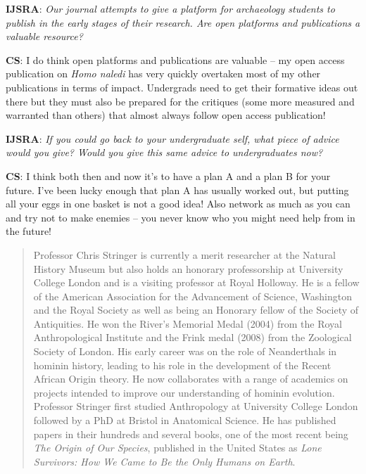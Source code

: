 \documentclass{ijsra}
\begin{document}
\textbf{IJSRA}: \textit{Our journal attempts to give a platform for archaeology students to publish in the early stages of their research.
Are open platforms and publications a valuable resource?}

\textbf{CS}: I do think open platforms and publications are valuable – my open access publication on \textit{Homo naledi} has
very quickly overtaken most of my other publications in terms of impact.
Undergrads need to get their formative ideas out there but they must also be prepared for the critiques
(some more measured and warranted than others) that almost always follow open access publication!

\textbf{IJSRA}: \textit{If you could go back to your undergraduate self, what piece of advice would you give?
Would you give this same advice to undergraduates now?}

\textbf{CS}: I think both then and now it’s to have a plan A and a plan B for your future.
I’ve been lucky enough that plan A has usually worked out, but putting all your eggs in one basket is not a good idea!
Also network as much as you can and try not to make enemies – you never know who you might need help from in the future!

\blockquote{Professor Chris Stringer is currently a merit researcher at the Natural History Museum but also holds
an honorary professorship at University College London and is a visiting professor at Royal Holloway.
He is a fellow of the American Association for the Advancement of Science, Washington and the Royal Society as well as
being an Honorary fellow of the Society of Antiquities. 
He won the River’s Memorial Medal (2004) from the Royal Anthropological Institute and the Frink medal (2008) from
the Zoological Society of London. His early career was on the role of Neanderthals in hominin history,
leading to his role in the development of the Recent African Origin theory.
He now collaborates with a range of academics on projects intended to improve our understanding of hominin evolution.
Professor Stringer first studied Anthropology at University College London followed by a PhD at Bristol in Anatomical Science.
He has published papers in their hundreds and several books, one of the most recent being \textit{The Origin of Our Species},
published in the United States as \textit{Lone Survivors: How We Came to Be the Only Humans on Earth}.}

\IJSRAclosing
\end{document}
